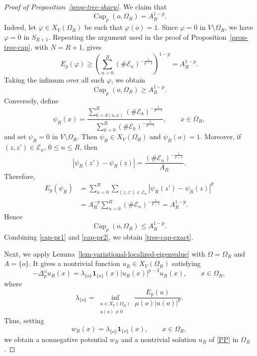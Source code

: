 \documentclass[twoside,12pt,letter]{article}
\theoremstyle{plain}
\theoremstyle{definition}
\theoremstyle{remark}
\numberwithin{equation}{section}
\begin{document}
\begin{proof}[Proof of Proposition~\ref{prop-tree-sharp}]
We claim that
\begin{equation}\label{tree-cap-exact}
\operatorname{Cap}_p(o,\Omega_R)=A_R^{1-p}.
\end{equation}
Indeed, let \(\varphi\in X_V(\Omega_R)\) be such that \(\varphi(o)=1\). Since
\(\varphi=0\) in \(V\setminus\Omega_R\), we have \(\varphi=0\) in
\(S_{R+1}\). Repeating the argument used in the proof of
Proposition~\ref{prop-tree-cap}, with \(N=R+1\), gives
\[
E_p(\varphi)
\ge
\left(
\sum_{n=0}^{R}
(\#\mathcal{E}_n)^{-\frac{1}{p-1}}
\right)^{1-p}
=
A_R^{1-p}.
\]
Taking the infimum over all such \(\varphi\), we obtain
\begin{equation}\label{cap-pr1}
\operatorname{Cap}_p(o,\Omega_R)\ge A_R^{1-p}.
\end{equation}
Conversely, define
\[
\psi_R(x)
=
\frac{\displaystyle\sum_{k=d(o,x)}^{R}
(\#\mathcal{E}_k)^{-\frac{1}{p-1}}}
{\displaystyle\sum_{k=0}^{R}
(\#\mathcal{E}_k)^{-\frac{1}{p-1}}},
\qquad x\in\Omega_R,
\]
and set \(\psi_R=0\) in \(V\setminus\Omega_R\).  Then
\(\psi_R\in X_V(\Omega_R)\) and \(\psi_R(o)=1\).  Moreover, if
\((z,z')\in\mathcal{E}_n\), \(0\le n\le R\), then
\[
|\psi_R(z')-\psi_R(z)|
=
\frac{(\#\mathcal{E}_n)^{-\frac{1}{p-1}}}{A_R}.
\]
Therefore,
\[
\begin{aligned}
E_p(\psi_R)
&=
\sum_{n=0}^{R}
\sum_{(z,z')\in\mathcal{E}_n}
|\psi_R(z')-\psi_R(z)|^p  \\
&=
A_R^{-p}
\sum_{n=0}^{R}
(\#\mathcal{E}_n)^{-\frac{1}{p-1}}
=
A_R^{1-p}.
\end{aligned}
\]
Hence
\begin{equation}\label{cap-pr2}
\operatorname{Cap}_p(o,\Omega_R)\le A_R^{1-p}.
\end{equation}
Combining \eqref{cap-pr1} and \eqref{cap-pr2}, we obtain \eqref{tree-cap-exact}.

Next, we apply Lemma~\ref{lem-variational-localized-eigenvalue} with
\(\Omega=\Omega_R\) and \(A=\{o\}\). It gives a nontrivial function \(u_R\in X_V(\Omega_R)\) satisfying
\[
-\Delta_p^\omega u_R(x)
=
\lambda_{\{o\}}\mathbf{1}_{\{o\}}(x)|u_R(x)|^{p-2}u_R(x),
\qquad x\in\Omega_R,
\]
where
\[
\lambda_{\{o\}}
=
\inf_{\substack{u\in X_V(\Omega_R)\\ u(o)\neq 0}}
\frac{E_p(u)}{\mu(o)|u(o)|^p}.
\]
Thus, setting
\[
w_R(x)=\lambda_{\{o\}}\mathbf{1}_{\{o\}}(x),
\qquad x\in\Omega_R,
\]
we obtain a nonnegative potential \(w_R\) and a nontrivial solution \(u_R\) of
\eqref{PP} in \(\Omega_R\).



\end{proof}
\end{document}
